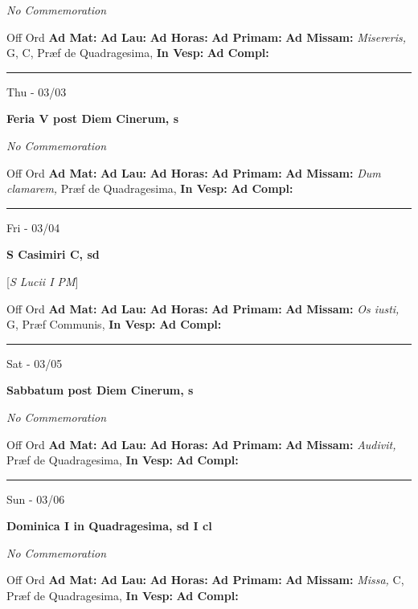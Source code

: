 \documentclass[letterpaper, 10pt]{article}
\begin{document}
\textit{No Commemoration}\begin{justify}
Off Ord
\textbf{Ad Mat: }
\textbf{Ad Lau: }
\textbf{Ad Horas: }
\textbf{Ad Primam: }
\textbf{Ad Missam:} \textit{Misereris, } G, C, Præf de Quadragesima, 
\textbf{In Vesp: }
\textbf{Ad Compl: }\end{justify}



\hrule
\begin{center}
Thu - 03/03
\end{center}\textbf{ \large Feria V post Diem Cinerum, \textnormal{\normalsize s}}

\textit{No Commemoration}\begin{justify}
Off Ord
\textbf{Ad Mat: }
\textbf{Ad Lau: }
\textbf{Ad Horas: }
\textbf{Ad Primam: }
\textbf{Ad Missam:} \textit{Dum clamarem, } Præf de Quadragesima, 
\textbf{In Vesp: }
\textbf{Ad Compl: }\end{justify}



\hrule
\begin{center}
Fri - 03/04
\end{center}\textbf{ \large S Casimiri C, \textnormal{\normalsize sd}}

[\textit{S Lucii I PM}]
\begin{justify}
Off Ord
\textbf{Ad Mat: }
\textbf{Ad Lau: }
\textbf{Ad Horas: }
\textbf{Ad Primam: }
\textbf{Ad Missam:} \textit{Os iusti, } G, Præf Communis, 
\textbf{In Vesp: }
\textbf{Ad Compl: }\end{justify}



\hrule
\begin{center}
Sat - 03/05
\end{center}\textbf{ \large Sabbatum post Diem Cinerum, \textnormal{\normalsize s}}

\textit{No Commemoration}\begin{justify}
Off Ord
\textbf{Ad Mat: }
\textbf{Ad Lau: }
\textbf{Ad Horas: }
\textbf{Ad Primam: }
\textbf{Ad Missam:} \textit{Audivit, } Præf de Quadragesima, 
\textbf{In Vesp: }
\textbf{Ad Compl: }\end{justify}



\hrule
\begin{center}
Sun - 03/06
\end{center}\textbf{ \large Dominica I in Quadragesima, \textnormal{\normalsize sd I cl}}

\textit{No Commemoration}\begin{justify}
Off Ord
\textbf{Ad Mat: }
\textbf{Ad Lau: }
\textbf{Ad Horas: }
\textbf{Ad Primam: }
\textbf{Ad Missam:} \textit{Missa, } C, Præf de Quadragesima, 
\textbf{In Vesp: }
\textbf{Ad Compl: }\end{justify}
\end{document}
